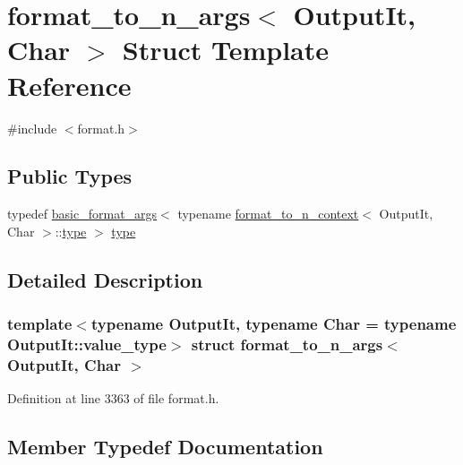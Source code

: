 \hypertarget{structformat__to__n__args}{}\section{format\+\_\+to\+\_\+n\+\_\+args$<$ Output\+It, Char $>$ Struct Template Reference}
\label{structformat__to__n__args}


{\ttfamily \#include $<$format.\+h$>$}

\subsection*{Public Types}
\begin{DoxyCompactItemize}
\item 
typedef \hyperlink{classbasic__format__args}{basic\+\_\+format\+\_\+args}$<$ typename \hyperlink{structformat__to__n__context}{format\+\_\+to\+\_\+n\+\_\+context}$<$ Output\+It, Char $>$\+::\hyperlink{structformat__to__n__args_a7ea8ff78b6e2db5594222df46970b069}{type} $>$ \hyperlink{structformat__to__n__args_a7ea8ff78b6e2db5594222df46970b069}{type}
\end{DoxyCompactItemize}


\subsection{Detailed Description}
\subsubsection*{template$<$typename Output\+It, typename Char = typename Output\+It\+::value\+\_\+type$>$\newline
struct format\+\_\+to\+\_\+n\+\_\+args$<$ Output\+It, Char $>$}



Definition at line 3363 of file format.\+h.



\subsection{Member Typedef Documentation}
\mbox{\label{structformat__to__n__args_a7ea8ff78b6e2db5594222df46970b069}} 
